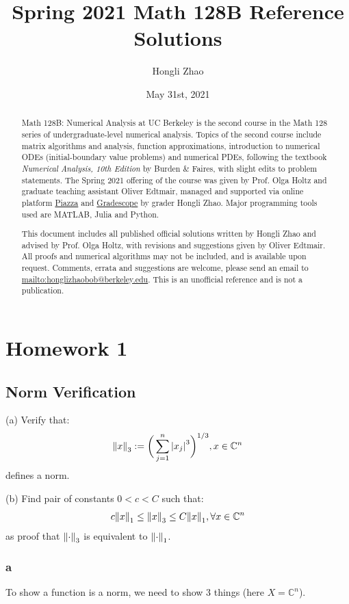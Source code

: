 \documentclass[12pt]{article} %
\author{Hongli Zhao}
\title{Spring 2021 Math 128B Reference Solutions}
\date{May 31st, 2021}
\newcommand{\cc}{\mathbb{C}}
\newcommand{\1}[1]{\mathds{1}\left[#1\right]}
\begin{document}
\maketitle

\begin{abstract}
	Math 128B: Numerical Analysis at UC Berkeley is the second course in the Math 128 series of undergraduate-level numerical analysis. Topics of the second course include matrix algorithms and analysis, function approximations, introduction to numerical ODEs (initial-boundary value problems) and numerical PDEs, following the textbook \emph{Numerical Analysis, 10th Edition} by Burden \& Faires, with slight edits to problem statements. The Spring 2021 offering of the course was given by Prof. Olga Holtz and graduate teaching assistant Oliver Edtmair, managed and supported via online platform \href{https://piazza.com/}{Piazza} and \href{https://www.gradescope.com/}{Gradescope} by grader Hongli Zhao. Major programming tools used are MATLAB, Julia and Python. 
	
	This document includes all published official solutions written by Hongli Zhao and advised by Prof. Olga Holtz, with revisions and suggestions given by Oliver Edtmair. All proofs and numerical algorithms may not be included, and is available upon request. Comments, errata and suggestions are welcome, please send an email to \url{mailto:honglizhaobob@berkeley.edu}. This is an unofficial reference and is not a publication.
\end{abstract}


\section{Homework 1}
\subsection{Norm Verification}

(a) Verify that:
$$
	\norm{x}_3 := \bigg( \sum_{j=1}^n \abs{x_j}^3\bigg)^{1/3}, x\in \mathbb{C}^n
$$ defines a norm.

(b) Find pair of constants $0<c<C$ such that:
$$
	c\norm{x}_1 \le \norm{x}_3 \le C\norm{x}_1, \forall x\in \cc^n
$$ as proof that $\norm{\cdot}_3$ is equivalent to $\norm{\cdot}_1$.

\subsubsection{a}
To show a function is a norm, we need to show 3 things (here $X =\mathbb{C}^n$). 
\end{document}
